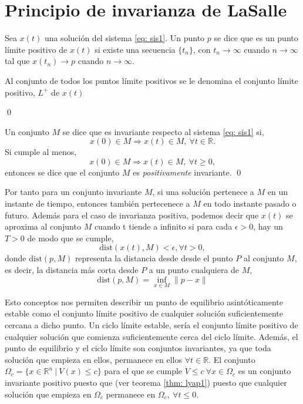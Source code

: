 \section{Principio de invarianza de LaSalle}

\begin{definition}
Sea $x(t)$ una solución del sistema \ref{eq: sis1}. Un punto $p$ se dice que es un punto límite positivo de $x(t)$ si existe una secuencia $\{t_n\}$, con $t_n\to \infty$ cuando $n\to \infty$ tal que $x(t_n) \to p$ cuando $n \to \infty$.

Al conjunto de todos los puntos límite positivos se le denomina el conjunto límite positivo, $L^+$ de $x(t)$

\qed
\end{definition}

\begin{definition}
Un conjunto $M$ se dice que es invariante respecto al sistema \ref{eq: sis1}  si,
\begin{equation*}
x(0) 	\in M \Rightarrow x(t) \in M,\ \forall t \in \mathbb{R}.
\end{equation*}
Si cumple al menos,
\begin{equation*}
x(0) 	\in M \Rightarrow x(t) \in M,\ \forall t \geq 0,
\end{equation*}
entonces se dice que el conjunto $M$ es \emph{positivamente} invariante.
\qed
\end{definition}

Por tanto para un conjunto invariante $M$, si una solución pertenece a $M$ en un instante de tiempo, entonces también pertecenece a $M$ en todo instante pasado o futuro. Además para el caso de invarianza positiva, podemos decir que $x(t)$ se aproxima al conjunto $M$ cuando t tiende a infinito si para cada $\epsilon >0$,  hay un $T>0$ de modo que se cumple,
\begin{equation*}
\text{dist}(x(t),M)<\epsilon, \forall t>0,
\end{equation*} 
donde $\text{dist}(p,M)$ representa la distancia desde desde el punto $P$ al conjunto $M$, es decir, la distancia más corta desde $P$ a un punto cualquiera de $M$,
\begin{equation}
\text{dist}(p,M) = \inf_{x\in M}\|p-x\|
\end{equation} 

Esto conceptos nos permiten describir un punto de equilibrio asintóticamente estable como el conjunto límite positivo de cualquier solución suficientemente cercana a dicho punto. Un ciclo límite estable, sería el conjunto límite positivo de cualquier solución que comienza suficientemente cerca del ciclo límite. Además, el punto de equilibrio y el ciclo límite son conjuntos invariantes, ya que toda solución que empieza en ellos, permanece en ellos $\forall t \in \mathbb{R}$. El conjunto $\Omega_c =\{x \in \mathbb{R}^n\ |\ V(x)\leq c\}$ para el que se cumple $\dot V \leq c\ \forall x \in \Omega_c$ es un conjunto invariante positivo puesto que (ver teorema \ref{thm: lyap1}) puesto que cualquier solución que empieza en $\Omega_c$ permanece en $\Omega_c, \ \forall t \leq 0$.

